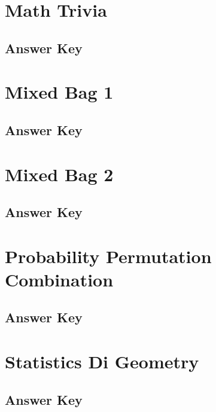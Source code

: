 \documentclass[12pt,a4paper]{book}
\newcounter{totalcounter}
\begin{document}
\setcounter{totalcounter}{1}

\section{Math Trivia}



\subsection*{Answer Key}



\setcounter{totalcounter}{1}

\section{Mixed Bag 1}



\subsection*{Answer Key}



\setcounter{totalcounter}{1}

\section{Mixed Bag 2}



\subsection*{Answer Key}



\setcounter{totalcounter}{1}

\section{Probability Permutation Combination}



\subsection*{Answer Key}



\setcounter{totalcounter}{1}

\section{Statistics Di Geometry}



\subsection*{Answer Key}


\end{document}
